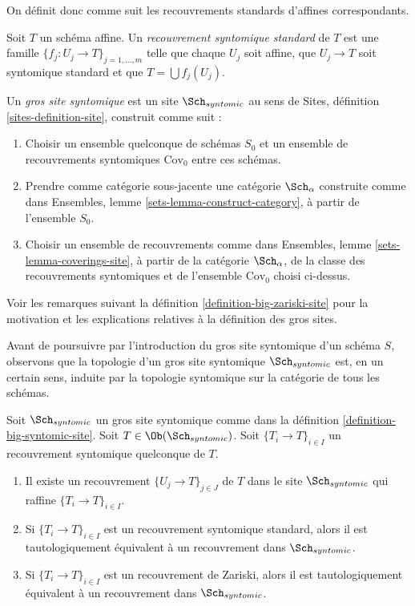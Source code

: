 \noindent
On définit donc comme suit les recouvrements standards d'affines correspondants.

\begin{definition}
\label{definition-standard-syntomic}
Soit $T$ un schéma affine. Un {\it recouvrement syntomique standard} de $T$ est
une famille $\{f_j : U_j \to T\}_{j = 1, \ldots, m}$ telle que chaque $U_j$ soit
affine, que $U_j \to T$ soit syntomique standard et que $T = \bigcup f_j(U_j)$.
\end{definition}

\begin{definition}
\label{definition-big-syntomic-site}
Un {\it gros site syntomique} est un site $\Sch_{syntomic}$ au sens de
Sites, définition \ref{sites-definition-site}, construit comme suit :
\begin{enumerate}
\item Choisir un ensemble quelconque de schémas $S_0$ et un ensemble de recouvrements syntomiques
$\text{Cov}_0$ entre ces schémas.
\item Prendre comme catégorie sous-jacente une catégorie $\Sch_\alpha$
construite comme dans Ensembles, lemme \ref{sets-lemma-construct-category},
à partir de l'ensemble $S_0$.
\item Choisir un ensemble de recouvrements comme dans
Ensembles, lemme \ref{sets-lemma-coverings-site}, à partir de la
catégorie $\Sch_\alpha$, de la classe des recouvrements syntomiques
et de l'ensemble $\text{Cov}_0$ choisi ci-dessus.
\end{enumerate}
\end{definition}

\noindent
Voir les remarques suivant la définition \ref{definition-big-zariski-site}
pour la motivation et les explications relatives à la définition des gros sites.

\medskip\noindent
Avant de poursuivre par l'introduction du gros site syntomique d'un
schéma $S$, observons que la topologie d'un gros site syntomique
$\Sch_{syntomic}$ est, en un certain sens, induite par la topologie syntomique
sur la catégorie de tous les schémas.

\begin{lemma}
\label{lemma-syntomic-induced}
Soit $\Sch_{syntomic}$ un gros site syntomique comme dans la
définition \ref{definition-big-syntomic-site}.
Soit $T \in \Ob(\Sch_{syntomic})$.
Soit $\{T_i \to T\}_{i \in I}$ un recouvrement syntomique quelconque de $T$.
\begin{enumerate}
\item Il existe un recouvrement $\{U_j \to T\}_{j \in J}$ de $T$ dans le site
$\Sch_{syntomic}$ qui raffine $\{T_i \to T\}_{i \in I}$.
\item Si $\{T_i \to T\}_{i \in I}$ est un recouvrement syntomique standard, alors
il est tautologiquement équivalent à un recouvrement dans $\Sch_{syntomic}$.
\item Si $\{T_i \to T\}_{i \in I}$ est un recouvrement de Zariski, alors
il est tautologiquement équivalent à un recouvrement dans $\Sch_{syntomic}$.
\end{enumerate}
\end{lemma}

